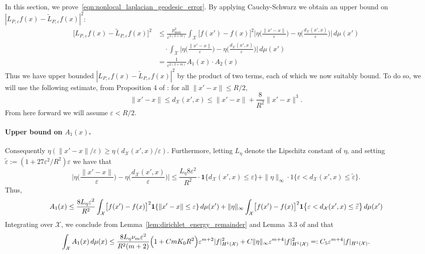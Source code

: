 \documentclass[aos]{imsart}
\theoremstyle{plain}
\theoremstyle{definition}
\theoremstyle{remark}
\newcommand{\wt}[1]{\widetilde{#1}}
\newcommand{\mc}[1]{\mathcal{#1}}
\newcommand{\1}{\mathbf{1}}
\begin{document}
In this section, we prove~\eqref{eqn:nonlocal_laplacian_geodesic_error}. By applying Cauchy-Schwarz we obtain an upper bound on $|L_{P,\varepsilon}f(x) - \wt{L}_{P,\varepsilon}f(x)|^2$:
\begin{align}
\bigl[L_{P,\varepsilon}f(x) - \wt{L}_{P,\varepsilon}f(x)\bigr]^2 & \leq \frac{p_{\max}^2}{\varepsilon^{2(2 + m)}} \int_{\mc{X}} \bigl[f(x') - f(x)\bigr]^2 \biggl|\eta\biggl(\frac{\|x' - x\|}{\varepsilon}\biggr) - \eta\biggl(\frac{d_{\mc{X}}(x',x)}{\varepsilon}\biggr)\biggr| \,d\mu(x') \nonumber \\
& \quad \cdot \int_{\mc{X}} \biggl|\eta\biggl(\frac{\|x' - x\|}{\varepsilon}\biggr) - \eta\biggl(\frac{d_{\mc{X}}(x',x)}{\varepsilon}\biggr)\biggr| \,d\mu(x') \nonumber \\
& = \frac{1}{\varepsilon^{2(2 + m)}} A_1(x) \cdot A_2(x) \label{pf:error_euclidean_distance_0}
\end{align} 
Thus we have upper bounded $|L_{P,\varepsilon}f(x) - \wt{L}_{P,\varepsilon}f(x)|^2$ by the product of two terms, each of which we now suitably bound. To do so, we will use the following estimate, from Proposition 4 of \cite{trillos2019}: for all $\|x' - x\| \leq R/2$,
\begin{equation}
\label{eqn:distance_error}
\|x' - x\| \leq d_{\mc{X}}(x',x) \leq \|x' - x\| + \frac{8}{R^2} \|x' - x\|^3.
\end{equation}
From here forward we will assume $\varepsilon < R/2$. 
\paragraph{Upper bound on $A_1(x)$.}
Consequently $\eta(\|x' - x\|/\varepsilon) \geq \eta(d_{\mc{X}}(x',x)/\varepsilon)$. Furthermore, letting $L_{\eta}$ denote the Lipschitz constant of $\eta$, and setting $\wt{\varepsilon} := (1 + 27\varepsilon^2/R^2)\varepsilon$ we have that
\begin{equation*}
\biggl|\eta\biggl(\frac{\|x' - x\|}{\varepsilon}\biggr) - \eta\biggl(\frac{d_{\mc{X}}(x',x)}{\varepsilon}\biggr)\biggr| \leq \frac{L_{\eta} 8 \varepsilon^2}{R^2} \cdot \1\bigl\{d_{\mc{X}}(x',x) \leq \varepsilon\bigr\} + \|\eta\|_{\infty} \cdot 1\{\varepsilon < d_{\mc{X}}(x',x) \leq \wt{\varepsilon}\}.
\end{equation*}
Thus,
\begin{equation*}
A_1(x) \leq \frac{8L_{\eta}\varepsilon^2}{R^2}\int_{\mc{X}}\bigl[f(x') - f(x)\bigr]^2 \1\{\|x' - x\| \leq \varepsilon\} \,d\mu(x') + \|\eta\|_{\infty} \int_{\mc{X}}\bigl[f(x') - f(x)\bigr]^2 \1\bigl\{\varepsilon < d_{\mc{X}}(x',x) \leq \wt{\varepsilon}\bigr\} \,d\mu(x') \\
\end{equation*}
Integrating over $\mc{X}$, we conclude from Lemma~\ref{lem:dirichlet_energy_remainder} and Lemma~3.3 of \citep{burago2014} and  that
\begin{equation*}
\int_{\mc{X}} A_1(x) \,d\mu(x) \leq \frac{8L_{\eta}\nu_m\varepsilon^2}{R^2(m + 2)} \Bigl(1 + CmK_0R^2\Bigr) \varepsilon^{m + 2} |f|_{H^1(\mc{X})}^2 + C\|\eta\|_{\infty}\varepsilon^{m + 4} |f|_{H^1(\mc{X})}^2 =: C_5 \varepsilon^{m + 4}|f|_{H^1(\mc{X})}.
\end{equation*}
\end{document}
